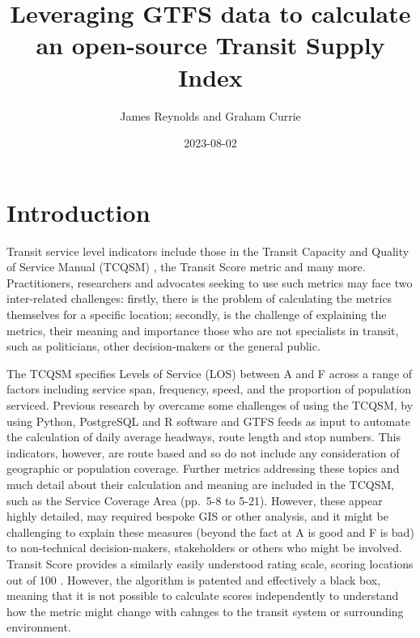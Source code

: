 \documentclass[]{tufte-book}
\title[Reynolds and Currie]{Leveraging GTFS data to calculate an
open-source Transit Supply Index}
\author{James Reynolds and Graham Currie}
\date{2023-08-02}
\begin{document}
\maketitle




\hypertarget{introduction}{%
\chapter{Introduction}\label{introduction}}

Transit service level indicators include those in the Transit Capacity
and Quality of Service Manual (TCQSM) \citep{TCQSM:2013}, the Transit
Score metric and many more. Practitioners, researchers and advocates
seeking to use such metrics may face two inter-related challenges:
firstly, there is the problem of calculating the metrics themselves for
a specific location; secondly, is the challenge of explaining the
metrics, their meaning and importance those who are not specialists in
transit, such as politicians, other decision-makers or the general
public.

The TCQSM specifies Levels of Service (LOS) between A and F across a
range of factors including service span, frequency, speed, and the
proportion of population serviced. Previous research by
\citet{Wong:2013aa} overcame some challenges of using the TCQSM, by
using Python, PostgreSQL and R software and GTFS feeds as input to
automate the calculation of daily average headways, route length and
stop numbers. This indicators, however, are route based and so do not
include any consideration of geographic or population coverage. Further
metrics addressing these topics and much detail about their calculation
and meaning are included in the TCQSM, such as the Service Coverage Area
(pp.~5-8 to 5-21). However, these appear highly detailed, may required
bespoke GIS or other analysis, and it might be challenging to explain
these measures (beyond the fact at A is good and F is bad) to
non-technical decision-makers, stakeholders or others who might be
involved. Transit Score provides a similarly easily understood rating
scale, scoring locations out of 100 \citep{WalkScore:2023tg}. However,
the algorithm is patented and effectively a black box, meaning that it
is not possible to calculate scores independently to understand how the
metric might change with cahnges to the transit system or surrounding
environment.
\end{document}
